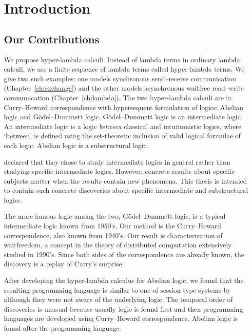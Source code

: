 \chapter{Introduction}

\section{Our Contributions}

We propose hyper-lambda calculi.
Instead of lambda terms in ordinary lambda calculi,
we use a finite sequence of lambda terms called hyper-lambda terms.
We give two such examples:
one models synchronous send--receive communication (Chapter~\ref{ch:exchange}) and
the other models asynchronous waitfree
read--write communication (Chapter~\ref{ch:lambda}).
The two hyper-lambda calculi are in Curry--Howard correspondence with
hypersequent formulation of logics: Abelian logic and G\"odel--Dummett
logic.
G\"odel--Dummett logic is an intermediate logic.
An intermediate logic is a logic \textit{between} classical and
intuitionistic logics, where `between' is defined using the
set-theoretic inclusion of valid logical formulae of each logic.
Abelian logic is a substructural logic.

\citet{hosoi-ono} declared that they chose to study intermediate
logics in
general rather than studying specific intermediate logics.
However, concrete results about specific subjects matter when the
results contain new phenomena.
This thesis is intended to contain such concrete discoveries
about specific intermediate and substructural logics.

The more famous logic among the two,
G\"odel--Dummett logic, is
a typical intermediate logic known from 1950's.
Our method is the Curry--Howard correspondence, also known from 1940's.
Our result is characterization of waitfreedom, a concept in the theory
of distributed computation extensively studied in 1990's.
Since both sides of the correspondence are already known,
the discovery is a replay of Curry's surprise.

After developing the hyper-lambda calculus for Abelian logic,
we found that the resulting programming language is similar to one of
session type systems by \citet{giunti2010} although they were not aware
of the underlying logic.  The temporal order of discoveries is unusual
because usually logic is found first and then programming languages are
developed using Curry--Howard correspondence.  Abelian logic is found
after the programming language.

